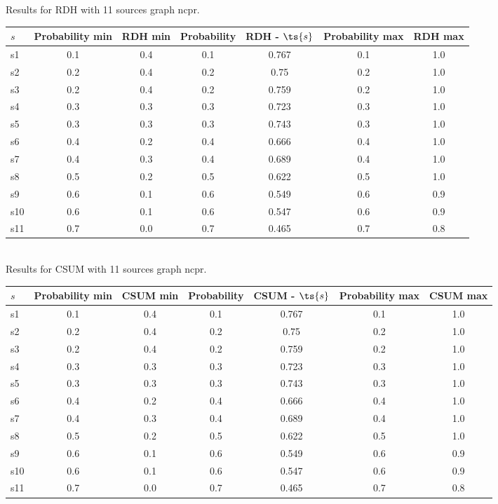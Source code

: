 \documentclass{article}
\begin{document}
\noindent Results for RDH with 11 sources graph ncpr.

\noindent\begin{tabular}{|l|c|c|c|c|c|c|}
\hline
$s$& Probability min & RDH min & Probability & RDH - $\ts{s}$ & Probability max & RDH max\\
\hline
s1 &0.1 & 0.4 & 0.1 & 0.767 & 0.1 & 1.0\\
\hline
s2 &0.2 & 0.4 & 0.2 & 0.75 & 0.2 & 1.0\\
\hline
s3 &0.2 & 0.4 & 0.2 & 0.759 & 0.2 & 1.0\\
\hline
s4 &0.3 & 0.3 & 0.3 & 0.723 & 0.3 & 1.0\\
\hline
s5 &0.3 & 0.3 & 0.3 & 0.743 & 0.3 & 1.0\\
\hline
s6 &0.4 & 0.2 & 0.4 & 0.666 & 0.4 & 1.0\\
\hline
s7 &0.4 & 0.3 & 0.4 & 0.689 & 0.4 & 1.0\\
\hline
s8 &0.5 & 0.2 & 0.5 & 0.622 & 0.5 & 1.0\\
\hline
s9 &0.6 & 0.1 & 0.6 & 0.549 & 0.6 & 0.9\\
\hline
s10 &0.6 & 0.1 & 0.6 & 0.547 & 0.6 & 0.9\\
\hline
s11 &0.7 & 0.0 & 0.7 & 0.465 & 0.7 & 0.8\\
\hline
\end{tabular}\\

\noindent Results for CSUM with 11 sources graph ncpr.

\noindent\begin{tabular}{|l|c|c|c|c|c|c|}
\hline
$s$& Probability min & CSUM min & Probability & CSUM - $\ts{s}$ & Probability max & CSUM max\\
\hline
s1 &0.1 & 0.4 & 0.1 & 0.767 & 0.1 & 1.0\\
\hline
s2 &0.2 & 0.4 & 0.2 & 0.75 & 0.2 & 1.0\\
\hline
s3 &0.2 & 0.4 & 0.2 & 0.759 & 0.2 & 1.0\\
\hline
s4 &0.3 & 0.3 & 0.3 & 0.723 & 0.3 & 1.0\\
\hline
s5 &0.3 & 0.3 & 0.3 & 0.743 & 0.3 & 1.0\\
\hline
s6 &0.4 & 0.2 & 0.4 & 0.666 & 0.4 & 1.0\\
\hline
s7 &0.4 & 0.3 & 0.4 & 0.689 & 0.4 & 1.0\\
\hline
s8 &0.5 & 0.2 & 0.5 & 0.622 & 0.5 & 1.0\\
\hline
s9 &0.6 & 0.1 & 0.6 & 0.549 & 0.6 & 0.9\\
\hline
s10 &0.6 & 0.1 & 0.6 & 0.547 & 0.6 & 0.9\\
\hline
s11 &0.7 & 0.0 & 0.7 & 0.465 & 0.7 & 0.8\\
\hline
\end{tabular}\\
\end{document}
